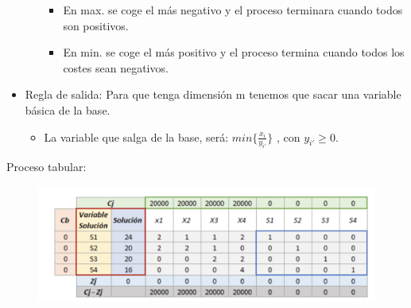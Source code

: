 \documentclass[12pt, twoside, openright]{report} %
\begin{document}
\begin{itemize}
\begin{enumerate}
        \begin{itemize}
      
        \item
          En max. se coge el más negativo y el proceso terminara cuando
          todos son positivos.
        \item
          En min. se coge el más positivo y el proceso termina cuando
          todos los costes sean negativos.
        \end{itemize}
      \end{enumerate}
    \item
      Regla de salida: Para que tenga dimensión m tenemos que sacar una
      variable básica de la base.

      \begin{itemize}
    
      \item
        La variable que salga de la base, será:
        \(min\{ \frac {x_i} {y_{i'}} \}\) , con \(y_{i'} \geq 0\).
      \end{itemize}
    \end{itemize}
\pagebreak
	Proceso tabular:
	\begin{figure}[H]
		{\includegraphics[scale=.3]{Untitled 11.png}}
	\end{figure}
\end{document}
